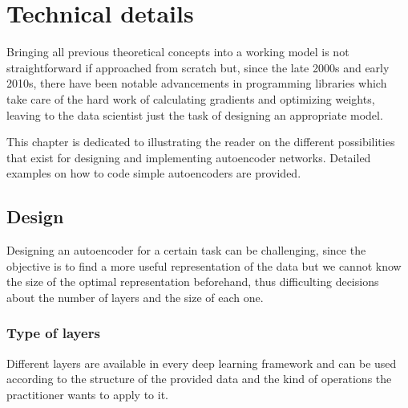 \setchapterpreamble[u]{\margintoc}
\chapter{Technical details}

Bringing all previous theoretical concepts into a working model is not straightforward if approached from scratch but, since the late 2000s and early 2010s, there have been notable advancements in programming libraries which take care of the hard work of calculating gradients and optimizing weights, leaving to the data scientist just the task of designing an appropriate model.

This chapter is dedicated to illustrating the reader on the different possibilities that exist for designing and implementing autoencoder networks. Detailed examples on how to code simple autoencoders are provided.

\section{Design}

Designing an autoencoder for a certain task can be challenging, since the objective is to find a more useful representation of the data but we cannot know the size of the optimal representation beforehand, thus difficulting decisions about the number of layers and the size of each one.

\subsection{Type of layers}

Different layers are available in every deep learning framework and can be used according to the structure of the provided data and the kind of operations the practitioner wants to apply to it.

